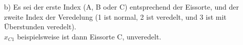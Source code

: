 \documentclass [a4paper,11pt]{article}
\begin{document}
\begin{enumerate}
\begin{enumerate}
                \newpage
            \item[b)]
                Es sei der erste Index (A, B oder C) entsprechend der Eissorte, und der zweite Index der Veredelung (1 ist normal, 2 ist veredelt, und 3 ist mit
                Überstunden veredelt).\\
                $x_{C1}$ beispielsweise ist dann Eissorte C, unveredelt.


\end{enumerate}
\end{enumerate}
\end{document}
